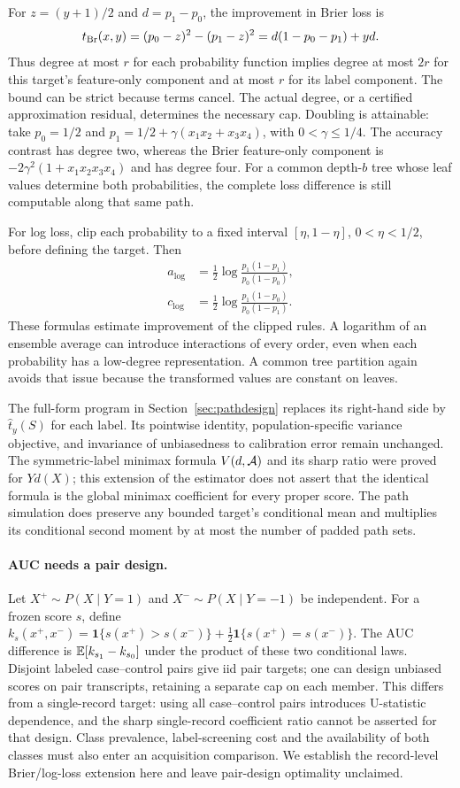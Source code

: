 For $z=(y+1)/2$ and $d=p_1-p_0$, the improvement in Brier loss is
\[
 t_{\rm Br}(x,y)=(p_0-z)^2-(p_1-z)^2
                =d(1-p_0-p_1)+yd.
\]
Thus degree at most $r$ for each probability function implies degree at most
$2r$ for this target's feature-only component and at most $r$ for its label
component. The bound can be strict because terms cancel. The actual degree,
or a certified approximation residual, determines the necessary cap.
Doubling is attainable: take $p_0=1/2$ and
$p_1=1/2+\gamma(x_1x_2+x_3x_4)$, with $0<\gamma\le1/4$.
The accuracy contrast has degree two, whereas the Brier feature-only
component is $-2\gamma^2(1+x_1x_2x_3x_4)$ and has degree four.
For a common depth-$b$ tree whose leaf values determine both probabilities,
the complete loss difference is still computable along that same path.

For log loss, clip each probability to a fixed interval
$[\eta,1-\eta]$, $0<\eta<1/2$, before defining the target. Then
\[
 \begin{split}
 a_{\log}&=\tfrac12\log\frac{p_1(1-p_1)}{p_0(1-p_0)},\\
 c_{\log}&=\tfrac12\log\frac{p_1(1-p_0)}{p_0(1-p_1)}.
 \end{split}
\]
These formulas estimate improvement of the clipped rules. A logarithm of
an ensemble average can introduce interactions of every order, even when
each probability has a low-degree representation. A common tree partition
again avoids that issue because the transformed values are constant on leaves.

The full-form program in Section~\ref{sec:pathdesign} replaces its
right-hand side by $\widehat t_y(S)$ for each label. Its pointwise identity,
population-specific variance objective, and invariance of unbiasedness to
calibration error remain unchanged. The symmetric-label minimax formula
$V(d,\mathcal A)$ and its sharp ratio were proved for $Yd(X)$; this extension of
the estimator does not assert that the identical formula is the global
minimax coefficient for every proper score. The path simulation does preserve
any bounded target's conditional mean and multiplies its conditional
second moment by at most the number of padded path sets.

\paragraph{AUC needs a pair design.}
Let $X^+\sim P(X\mid Y=1)$ and $X^-\sim P(X\mid Y=-1)$ be independent.
For a frozen score $s$, define
$k_s(x^+,x^-)=\mathbf1\{s(x^+)>s(x^-)\}
+\tfrac12\mathbf1\{s(x^+)=s(x^-)\}$.
The AUC difference is $\mathbb{E}[k_{s_1}-k_{s_0}]$ under the product of these two
conditional laws. Disjoint labeled case--control pairs give iid pair targets;
one can design unbiased scores on pair transcripts, retaining a separate
cap on each member. This differs from a single-record target: using all
case--control pairs introduces U-statistic dependence, and the sharp
single-record coefficient ratio cannot be asserted for that design.
Class prevalence, label-screening cost and the availability of both classes
must also enter an acquisition comparison. We establish the record-level
Brier/log-loss extension here and leave pair-design optimality unclaimed.

